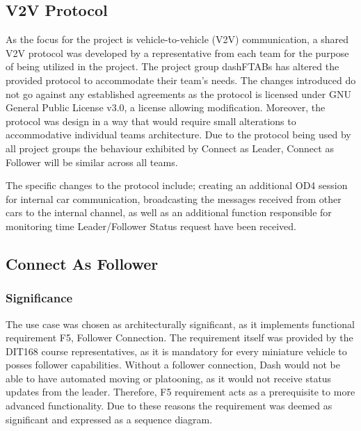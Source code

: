 \documentclass[12pt]{article}
\begin{document}
\subsection{V2V Protocol}
As the focus for the project is vehicle-to-vehicle (V2V) communication, a shared V2V protocol was developed by a representative from each team for the purpose of being utilized in the project. The project group dashFTABs has altered the provided protocol to accommodate their team's needs. The changes introduced do not go against any established agreements as the protocol is licensed under GNU General Public License v3.0, a license allowing modification. Moreover, the protocol was design in a way that would require small alterations to accommodative individual teams architecture. Due to the protocol being used by all project groups the behaviour exhibited by Connect as Leader, Connect as Follower will be similar across all teams.\par
The specific changes to the protocol include; creating an additional OD4 session for internal car communication, broadcasting the messages received from other cars to the internal channel, as well as an additional function responsible for monitoring time Leader/Follower Status request have been received. \par  

\subsection{Connect As Follower}
\subsubsection{Significance}
 The use case was chosen as architecturally significant, as it implements functional requirement F5, Follower Connection. The requirement itself was provided by the DIT168 course representatives, as it is mandatory for every miniature vehicle to posses follower capabilities. Without a follower connection, Dash would not be able to have automated moving or platooning, as it would not receive status updates from the leader. Therefore, F5 requirement acts as a prerequisite to more advanced functionality. Due to these reasons the requirement was deemed as significant and expressed as a sequence diagram.\par
\end{document}
